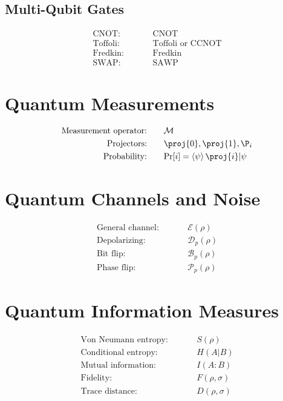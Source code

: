 \documentclass[12pt]{article}
\newcommand{\cnot}{\text{CNOT}}
\newcommand{\ccnot}{\text{CCNOT}}
\newcommand{\toffoli}{\text{Toffoli}}
\newcommand{\fredkin}{\text{Fredkin}}
\newcommand{\projzero}{\proj{0}}
\newcommand{\projone}{\proj{1}}
\newcommand{\channel}{\mathcal{E}}
\newcommand{\depolar}{\mathcal{D}}
\newcommand{\bitflip}{\mathcal{B}}
\newcommand{\phaseflip}{\mathcal{P}}
\newcommand{\condentropy}[2]{H(#1|#2)}
\newcommand{\mutualinfo}[2]{I(#1:#2)}
\newcommand{\vonneumann}[1]{S(#1)}
\newcommand{\fidelity}[2]{F(#1, #2)}
\newcommand{\tracedist}[2]{D(#1, #2)}
\newcommand{\prob}[1]{\text{Pr}[#1]}
\theoremstyle{definition}
\theoremstyle{remark}
\begin{document}
\begin{multicols}{2}
\subsection{Multi-Qubit Gates}
\begin{alignat}{2}
\text{CNOT:}     &\quad && \cnot \\
\text{Toffoli:}  &\quad && \toffoli \text{ or } \ccnot \\
\text{Fredkin:}  &\quad && \fredkin \\
\text{SWAP:}     &\quad && \text{SAWP}
\end{alignat}

\section{Quantum Measurements}

\begin{alignat}{2}
\text{Measurement operator:} &\quad && \mathcal{M} \\
\text{Projectors:}           &\quad && \projzero, \projone, \P_{i} \\
\text{Probability:}          &\quad && \prob{i} = \braket{\psi}{\proj{i}|\psi}
\end{alignat}



\section{Quantum Channels and Noise}

\begin{alignat}{2}
\text{General channel:} &\quad && \channel(\rho) \\
\text{Depolarizing:}    &\quad && \depolar_p(\rho) \\
\text{Bit flip:}        &\quad && \bitflip_p(\rho) \\
\text{Phase flip:}      &\quad && \phaseflip_p(\rho)
\end{alignat}


\section{Quantum Information Measures}

\begin{alignat}{2}
\text{Von Neumann entropy:} &\quad && \vonneumann{\rho} \\
\text{Conditional entropy:} &\quad && \condentropy{A}{B} \\
\text{Mutual information:}  &\quad && \mutualinfo{A}{B} \\
\text{Fidelity:}             &\quad && \fidelity{\rho}{\sigma} \\
\text{Trace distance:}       &\quad && \tracedist{\rho}{\sigma}
\end{alignat}



\end{multicols}
\end{document}
